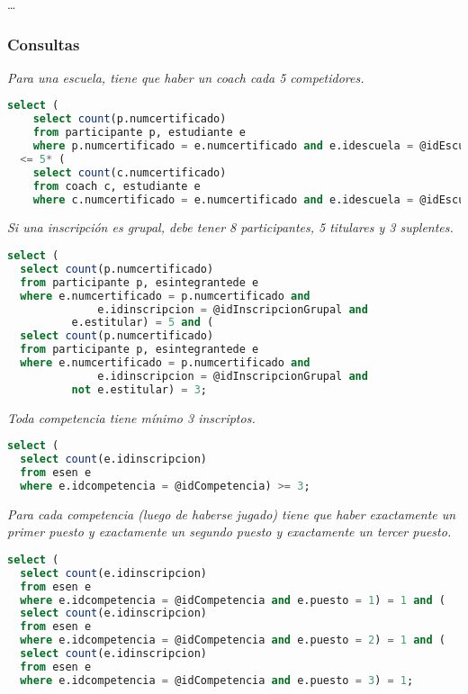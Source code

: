 \ldots

\subsubsection{Consultas}
\emph{Para una escuela, tiene que haber un coach cada 5 competidores.}

\begin{lstlisting}[language=SQL]
select (
    select count(p.numcertificado)
    from participante p, estudiante e
    where p.numcertificado = e.numcertificado and e.idescuela = @idEscuela)
  <= 5* (
    select count(c.numcertificado)
    from coach c, estudiante e
    where c.numcertificado = e.numcertificado and e.idescuela = @idEscuela);
\end{lstlisting}

\emph{Si una inscripción es grupal, debe tener 8 participantes, 5 titulares y 3 suplentes.}

\begin{lstlisting}[language=SQL]
select (
  select count(p.numcertificado)
  from participante p, esintegrantede e
  where e.numcertificado = p.numcertificado and
              e.idinscripcion = @idInscripcionGrupal and
	      e.estitular) = 5 and (
  select count(p.numcertificado)
  from participante p, esintegrantede e
  where e.numcertificado = p.numcertificado and
              e.idinscripcion = @idInscripcionGrupal and
	      not e.estitular) = 3;
\end{lstlisting}

\emph{Toda competencia tiene mínimo 3 inscriptos.}

\begin{lstlisting}[language=SQL]
select (
  select count(e.idinscripcion)
  from esen e
  where e.idcompetencia = @idCompetencia) >= 3;
\end{lstlisting}

\emph{Para cada competencia (luego de haberse jugado) tiene que haber exactamente un primer puesto y exactamente un segundo puesto y exactamente un tercer puesto.}

\begin{lstlisting}[language=SQL]
select (
  select count(e.idinscripcion)
  from esen e
  where e.idcompetencia = @idCompetencia and e.puesto = 1) = 1 and (
  select count(e.idinscripcion)
  from esen e
  where e.idcompetencia = @idCompetencia and e.puesto = 2) = 1 and (
  select count(e.idinscripcion)
  from esen e
  where e.idcompetencia = @idCompetencia and e.puesto = 3) = 1;
\end{lstlisting}

